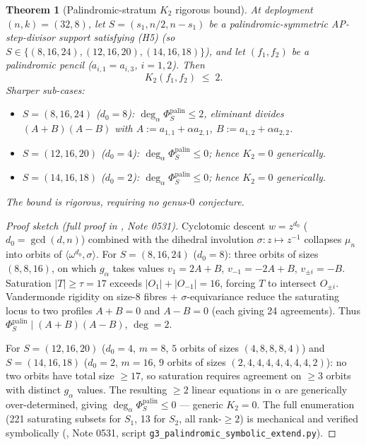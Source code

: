 \documentclass[11pt]{article}
\newtheorem{theorem}{Theorem}[section]
\theoremstyle{definition}
\theoremstyle{remark}
\begin{document}
\begin{theorem}[Palindromic-stratum $K_2$ rigorous bound]
\label{thm:K2-palindromic-bound}
At deployment $(n, k) = (32, 8)$, let
$S = (s_1, n/2, n - s_1)$ be a palindromic-symmetric AP-step-divisor
support satisfying (H5) (so $S \in \{(8, 16, 24), (12, 16, 20), (14, 16, 18)\}$),
and let $(f_1, f_2)$ be a palindromic pencil ($a_{i,1} = a_{i,3}$,
$i = 1, 2$). Then
\[
 \boxed{\quad K_2(f_1, f_2) \;\leq\; 2. \quad}
\]
Sharper sub-cases:
\begin{itemize}
\item $S = (8, 16, 24)$ ($d_0 = 8$): $\deg_\alpha \Phi_S^{\mathrm{palin}} \leq 2$,
  eliminant divides $(A + B)(A - B)$ with
  $A := a_{1,1} + \alpha a_{2,1}$, $B := a_{1,2} + \alpha a_{2,2}$.
\item $S = (12, 16, 20)$ ($d_0 = 4$): $\deg_\alpha \Phi_S^{\mathrm{palin}} \leq 0$;
  hence $K_2 = 0$ generically.
\item $S = (14, 16, 18)$ ($d_0 = 2$): $\deg_\alpha \Phi_S^{\mathrm{palin}} \leq 0$;
  hence $K_2 = 0$ generically.
\end{itemize}
The bound is rigorous, requiring \emph{no} genus-$0$ conjecture.
\end{theorem}

\begin{proof}[Proof sketch (full proof in \cite{CompanionRepo}, Note 0531)]
Cyclotomic descent $w = z^{d_0}$ ($d_0 = \gcd(d, n)$) combined with
the dihedral involution $\sigma : z \mapsto z^{-1}$ collapses $\mu_n$
into orbits of $\langle \omega^{d_0}, \sigma\rangle$. For
$S = (8, 16, 24)$ ($d_0 = 8$): three orbits of sizes $(8, 8, 16)$, on
which $g_\alpha$ takes values $v_1 = 2A + B$, $v_{-1} = -2A + B$,
$v_{\pm i} = -B$. Saturation $|T| \geq \tau = 17$ exceeds
$|O_1| + |O_{-1}| = 16$, forcing $T$ to intersect $O_{\pm i}$.
Vandermonde rigidity on size-$8$ fibres + $\sigma$-equivariance reduce
the saturating locus to two profiles $A + B = 0$ and $A - B = 0$
(each giving 24 agreements). Thus
$\Phi_S^{\mathrm{palin}} \mid (A + B)(A - B)$, $\deg = 2$.

For $S = (12, 16, 20)$ ($d_0 = 4$, $m = 8$, $5$ orbits of sizes
$(4, 8, 8, 8, 4)$) and $S = (14, 16, 18)$ ($d_0 = 2$, $m = 16$, $9$
orbits of sizes $(2, 4, 4, 4, 4, 4, 4, 4, 2)$): no two orbits have
total size $\geq 17$, so saturation requires agreement on $\geq 3$
orbits with distinct $g_\alpha$ values. The resulting $\geq 2$
linear equations in $\alpha$ are generically over-determined, giving
$\deg_\alpha \Phi_S^{\mathrm{palin}} \leq 0$ — generic
$K_2 = 0$. The full enumeration (221 saturating subsets for $S_1$,
13 for $S_2$, all rank-$\geq 2$) is mechanical and verified
symbolically (\cite{CompanionRepo}, Note 0531, script
\texttt{g3\_palindromic\_symbolic\_extend.py}).
\end{proof}
\end{document}

